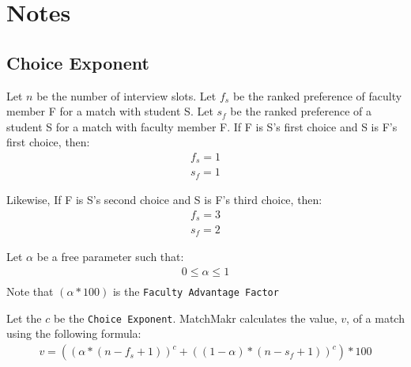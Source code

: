 %
%


%
%
\section{Notes}

\subsection{Choice Exponent}
Let $n$ be the number of interview slots.  Let $f_s$ be the ranked preference of faculty member F for a match with student S.  Let $s_f$ be the ranked preference of a student S for a match with faculty member F.  If F is S's first choice and S is F's first choice, then:
\begin{equation}
	\begin{aligned}
		f_s = 1 \\
		s_f = 1
	\end{aligned}
\end{equation}

Likewise, If F is S's second choice and S is F's third choice, then:
\begin{equation}
	\begin{aligned}
		f_s = 3 \\
		s_f = 2
	\end{aligned}
\end{equation}

Let $\alpha$ be a free parameter such that:
\begin{equation}
	\begin{aligned}
		0 \le \alpha \le 1 \\
	\end{aligned}
\end{equation}
Note that $(\alpha * 100)$ is the \texttt{Faculty Advantage Factor}

Let the $c$ be the \texttt{Choice Exponent}.  MatchMakr calculates the value, $v$, of a match using the following formula:
\begin{equation}
	\label{eq:value}
	\begin{aligned}
		v = \left( (\alpha * (n - f_s + 1))^c + ((1-\alpha) * (n - s_f + 1))^c  \right) * 100\\
	\end{aligned}
\end{equation}

